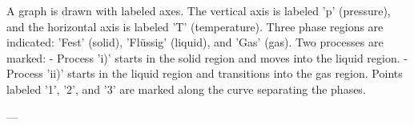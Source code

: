 A graph is drawn with labeled axes. The vertical axis is labeled 'p' (pressure), and the horizontal axis is labeled 'T' (temperature). Three phase regions are indicated: 'Fest' (solid), 'Flüssig' (liquid), and 'Gas' (gas). Two processes are marked:  
- Process 'i)' starts in the solid region and moves into the liquid region.  
- Process 'ii)' starts in the liquid region and transitions into the gas region.  
Points labeled '1', '2', and '3' are marked along the curve separating the phases.

---